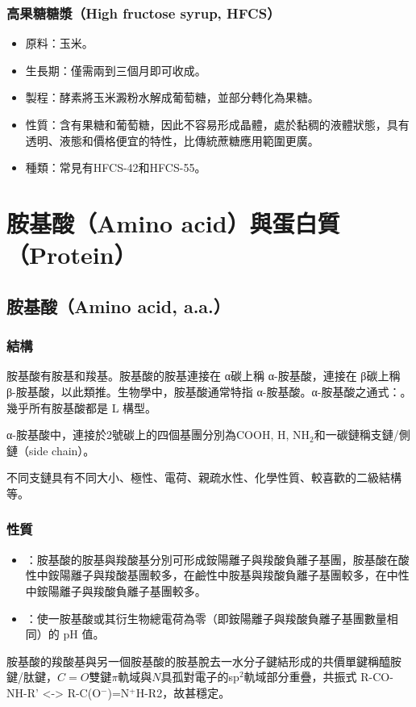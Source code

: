 \documentclass[a4paper,12pt]{report}
\begin{document}
\begin{itemize}
\begin{itemize}
\subsubsection{高果糖糖漿（High fructose syrup, HFCS）}
\begin{itemize}
\item 原料：玉米。
\item 生長期：僅需兩到三個月即可收成。
\item 製程：酵素將玉米澱粉水解成葡萄糖，並部分轉化為果糖。
\item 性質：含有果糖和葡萄糖，因此不容易形成晶體，處於黏稠的液體狀態，具有透明、液態和價格便宜的特性，比傳統蔗糖應用範圍更廣。
\item 種類：常見有HFCS-42和HFCS-55。
\end{itemize}


\section{胺基酸（Amino acid）與蛋白質（Protein）}
\subsection{胺基酸（Amino acid, a.a.）}
\subsubsection{結構}
胺基酸有胺基和羧基。胺基酸的胺基連接在 α碳上稱 α-胺基酸，連接在 β碳上稱 β-胺基酸，以此類推。生物學中，胺基酸通常特指 α-胺基酸。α-胺基酸之通式：。幾乎所有胺基酸都是 L 構型。

α-胺基酸中，連接於2號碳上的四個基團分別為COOH, H, NH$_2$和一碳鏈稱支鏈/側鏈（side chain）。

不同支鏈具有不同大小、極性、電荷、親疏水性、化學性質、較喜歡的二級結構等。
\subsubsection{性質}
\begin{itemize}
\item {}：胺基酸的胺基與羧酸基分別可形成銨陽離子與羧酸負離子基團，胺基酸在酸性中銨陽離子與羧酸基團較多，在鹼性中胺基與羧酸負離子基團較多，在中性中銨陽離子與羧酸負離子基團較多。
\item {}：使一胺基酸或其衍生物總電荷為零（即銨陽離子與羧酸負離子基團數量相同）的 pH 值。
\end{itemize}
胺基酸的羧酸基與另一個胺基酸的胺基脫去一水分子鍵結形成的共價單鍵稱醯胺鍵/肽鍵，$C=O$雙鍵$\pi$軌域與$N$具孤對電子的sp$^2$軌域部分重疊，共振式 R-CO-NH-R' <-> R-C(O$^-$)=N$^+$H-R2，故甚穩定。

\end{itemize}
\end{itemize}
\end{document}
